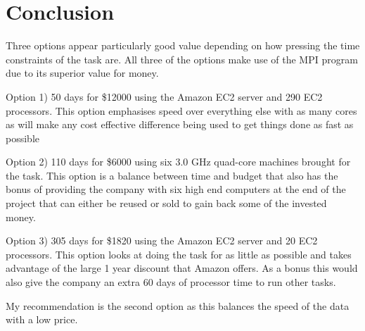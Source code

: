 \section*{Conclusion}

Three options appear particularly good value depending on how pressing the time constraints of the task are. All three of the options make use of the MPI program due to its superior value for money.

Option 1) 50 days for \$12000 using the Amazon EC2 server and 290 EC2 processors. This option emphasises speed over everything else with as many cores as will make any cost effective difference being used to get things done as fast as possible

Option 2) 110 days for \$6000 using six 3.0 GHz quad-core machines brought for the task. This option is a balance between time and budget that also has the bonus of providing the company with six high end computers at the end of the project that can either be reused or sold to gain back some of the invested money.

Option 3) 305 days for \$1820 using the Amazon EC2 server and 20 EC2 processors. This option looks at doing the task for as little as possible and takes advantage of the large 1 year discount that Amazon offers. As a bonus this would also give the company an extra 60 days of processor time to run other tasks.  


My recommendation is the second option as this balances the speed of the data with a low price.